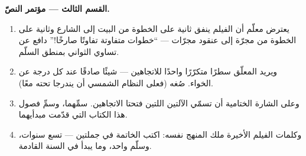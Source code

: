 \begin{problem}
\medskip\noindent\textbf{القسم الثالث --- مؤتمر النصّ.}
\begin{enumerate}[resume]
  \item يعترض معلّم أن الفيلم ينفق ثانية على الخطوة من
        البيت إلى الشارع وثانية على الخطوة من مجرّة إلى
        عنقود مجرّات --- ``خطوات متفاوتة تفاوتًا صارخًا!''
        دافع عن تساوي الثواني بمنطق السلّم.
  \item ويريد المعلّق سطرًا متكرّرًا واحدًا للاتجاهين ---
        شيئًا صادقًا عند كل درجة عن الخواء. صُغه (فعلى
        النظام الشمسي  أن يندرجا تحته معًا).
  \item وعلى الشارة الختامية أن تسمّي الآلتين اللتين فتحتا
        الاتجاهين. سمِّهما، وسمِّ فصول هذا الكتاب التي
        قدّمت مبدأيهما.
  \item وكلمات الفيلم الأخيرة ملك المنهج نفسه: اكتب الخاتمة
        في جملتين --- تسع سنوات، وسلّم واحد، وما يبدأ في
        السنة القادمة.
\end{enumerate}
\end{problem}
